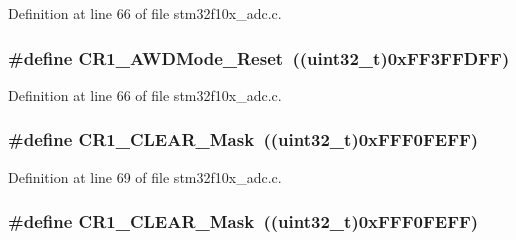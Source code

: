 Definition at line 66 of file stm32f10x\+\_\+adc.\+c.

\subsubsection[{\texorpdfstring{C\+R1\+\_\+\+A\+W\+D\+Mode\+\_\+\+Reset}{CR1_AWDMode_Reset}}]{\setlength{\rightskip}{0pt plus 5cm}\#define C\+R1\+\_\+\+A\+W\+D\+Mode\+\_\+\+Reset~(({\bf uint32\+\_\+t})0x\+F\+F3\+F\+F\+D\+F\+F)}\hypertarget{group___a_d_c___private___defines_gae53703f0c718ecc5b3e1a69c60af3697}{}\label{group___a_d_c___private___defines_gae53703f0c718ecc5b3e1a69c60af3697}


Definition at line 66 of file stm32f10x\+\_\+adc.\+c.

\subsubsection[{\texorpdfstring{C\+R1\+\_\+\+C\+L\+E\+A\+R\+\_\+\+Mask}{CR1_CLEAR_Mask}}]{\setlength{\rightskip}{0pt plus 5cm}\#define C\+R1\+\_\+\+C\+L\+E\+A\+R\+\_\+\+Mask~(({\bf uint32\+\_\+t})0x\+F\+F\+F0\+F\+E\+F\+F)}\hypertarget{group___a_d_c___private___defines_ga67f7dd35ea3d1296677e5fc50b88fa90}{}\label{group___a_d_c___private___defines_ga67f7dd35ea3d1296677e5fc50b88fa90}


Definition at line 69 of file stm32f10x\+\_\+adc.\+c.

\subsubsection[{\texorpdfstring{C\+R1\+\_\+\+C\+L\+E\+A\+R\+\_\+\+Mask}{CR1_CLEAR_Mask}}]{\setlength{\rightskip}{0pt plus 5cm}\#define C\+R1\+\_\+\+C\+L\+E\+A\+R\+\_\+\+Mask~(({\bf uint32\+\_\+t})0x\+F\+F\+F0\+F\+E\+F\+F)}\hypertarget{group___a_d_c___private___defines_ga67f7dd35ea3d1296677e5fc50b88fa90}{}\label{group___a_d_c___private___defines_ga67f7dd35ea3d1296677e5fc50b88fa90}


